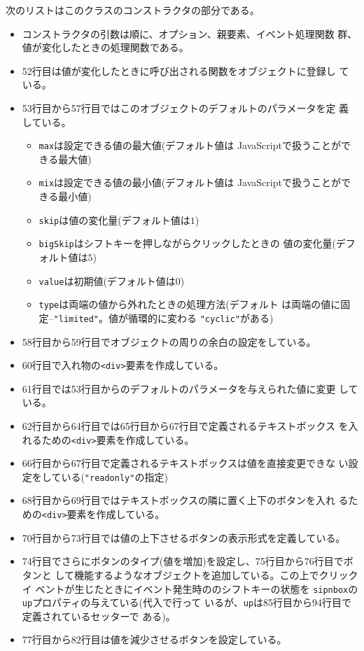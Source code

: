次のリストはこのクラスのコンストラクタの部分である。
\begin{itemize}
 \item コンストラクタの引数は順に、オプション、親要素、イベント処理関数
       群、値が変化したときの処理関数である。
 \item 52行目は値が変化したときに呼び出される関数をオブジェクトに登録し
       ている。
 \item 53行目から57行目ではこのオブジェクトのデフォルトのパラメータを定
       義している。
       \begin{itemize}
        \item \texttt{max}は設定できる値の最大値(デフォルト値は
              JavaScriptで扱うことができる最大値)
        \item \texttt{mix}は設定できる値の最小値(デフォルト値は
              JavaScriptで扱うことができる最小値)
        \item \texttt{skip}は値の変化量(デフォルト値は$1$)
        \item \texttt{bigSkip}はシフトキーを押しながらクリックしたときの
              値の変化量(デフォルト値は$5$)
        \item \texttt{value}は初期値(デフォルト値は$0$)
        \item \texttt{type}は両端の値から外れたときの処理方法(デフォルト
              は両端の値に固定--\texttt{"limited"}。値が循環的に変わる
              \texttt{"cyclic"}がある)
       \end{itemize}
 \item 58行目から59行目でオブジェクトの周りの余白の設定をしている。
 \item 60行目で入れ物の\texttt{<div>}要素を作成している。
 \item 61行目では53行目からのデフォルトのパラメータを与えられた値に変更
       している。
 \item 62行目から64行目では65行目から67行目で定義されるテキストボックス
       を入れるための\texttt{<div>}要素を作成している。
 \item 66行目から67行目で定義されるテキストボックスは値を直接変更できな
       い設定をしている(\texttt{"readonly"}の指定)
 \item 68行目から69行目ではテキストボックスの隣に置く上下のボタンを入れ
       るための\texttt{<div>}要素を作成している。
 \item 70行目から73行目では値の上下させるボタンの表示形式を定義している。
 \item 74行目でさらにボタンのタイプ(値を増加)を設定し、75行目から76行目でボタンと
       して機能するようなオブジェクトを追加している。この上でクリックイ
       ベントが生じたときにイベント発生時ののシフトキーの状態を
       \texttt{sipnbox}の\texttt{up}プロパティの与えている(代入で行って
       いるが、\texttt{up}は85行目から94行目で定義されているセッターで
       ある)。
 \item 77行目から82行目は値を減少させるボタンを設定している。
\end{itemize}
